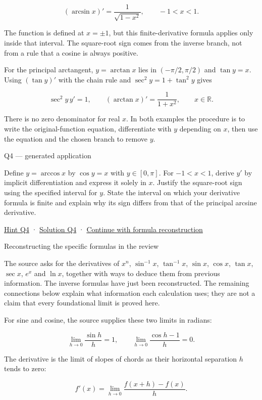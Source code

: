 \documentclass[
  11pt,
]{article}
\providecommand{\lt}{<}
\begin{document}
\[(\arcsin x)'=\frac1{\sqrt{1-x^2}},\qquad -1<x<1.\]

The function is defined at \(x=\pm1\), but this finite-derivative
formula applies only inside that interval. The square-root sign comes
from the inverse branch, not from a rule that a cosine is always
positive.

For the principal arctangent, \(y=\arctan x\) lies in \((-\pi/2,\pi/2)\)
and \(\tan y=x\). Using \((\tan y)'\) with the chain rule and
\(\sec^2y=1+\tan^2y\) gives

\[\sec^2y\,y'=1,
\qquad
(\arctan x)'=\frac1{1+x^2},\qquad x\in\mathbb R.\]

There is no zero denominator for real \(x\). In both examples the
procedure is to write the original-function equation, differentiate with
\(y\) depending on \(x\), then use the equation and the chosen branch to
remove \(y\).

Q4 --- generated application

Define \(y=\arccos x\) by \(\cos y=x\) with \(y\in[0,\pi]\). For
\(-1\lt x\lt 1\), derive \(y'\) by implicit differentiation and express
it solely in \(x\). Justify the square-root sign using the specified
interval for \(y\). State the interval on which your derivative formula
is finite and explain why its sign differs from that of the principal
arcsine derivative.

\protect\hyperlink{hint-q4}{Hint Q4} ·
\protect\hyperlink{solution-q4}{Solution Q4} ·
\protect\hyperlink{reconstruct}{Continue with formula reconstruction}

Reconstructing the specific formulas in the review

The source asks for the derivatives of \(x^n\), \(\sin^{-1}x\),
\(\tan^{-1}x\), \(\sin x\), \(\cos x\), \(\tan x\), \(\sec x\), \(e^x\)
and \(\ln x\), together with ways to deduce them from previous
information. The inverse formulas have just been reconstructed. The
remaining connections below explain what information each calculation
uses; they are not a claim that every foundational limit is proved here.

For sine and cosine, the source supplies these two limits in radians:

\[\lim_{h\to0}\frac{\sin h}{h}=1,
\qquad
\lim_{h\to0}\frac{\cos h-1}{h}=0.\]

The derivative is the limit of slopes of chords as their horizontal
separation \(h\) tends to zero:

\[f'(x)=\lim_{h\to0}\frac{f(x+h)-f(x)}h.\]
\end{document}
